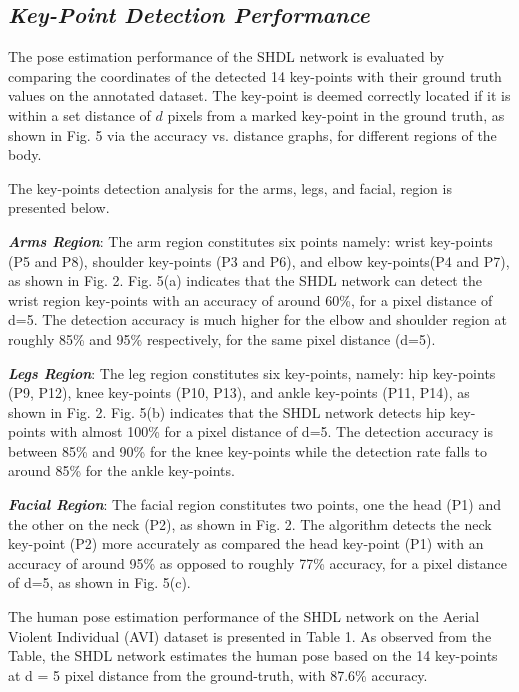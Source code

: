 \documentclass[10pt,twocolumn,letterpaper]{article}
\begin{document}
\subsection{\textbf{\textit{Key-Point Detection Performance}}}
The pose estimation performance of the SHDL network is evaluated by comparing the coordinates of the detected 14 key-points with their ground truth values on the annotated dataset. The key-point is deemed correctly located if it is within a set distance of $d$ pixels from a marked key-point in the ground truth, as shown in Fig. 5 via the accuracy vs. distance graphs, for different regions of the body.

The key-points detection analysis for the arms, legs, and facial, region is presented below. 

\textbf{\textit{Arms Region}}: The arm region constitutes six points namely: wrist key-points (P5 and P8), shoulder key-points (P3 and P6), and elbow key-points(P4 and P7), as shown in Fig. 2. Fig. 5(a) indicates that the SHDL network can detect the wrist region key-points with an accuracy of around 60\%, for a pixel distance of d=5. The detection accuracy is much higher for the elbow and shoulder region at roughly 85\% and 95\% respectively, for the same pixel distance (d=5).

\textbf{\textit{Legs Region}}: The leg region constitutes six key-points, namely: hip key-points (P9, P12), knee key-points (P10, P13), and ankle key-points (P11, P14), as shown in Fig. 2. Fig. 5(b) indicates that the SHDL network detects hip key-points with almost 100\% for a pixel distance of d=5. The detection accuracy is between 85\% and 90\% for the knee key-points while the detection rate falls to around 85\% for the ankle key-points.

\textbf{\textit{Facial Region}}: The facial region constitutes two points, one the head (P1) and the other on the neck (P2), as shown in Fig. 2. The algorithm detects the neck key-point (P2) more accurately as compared the head key-point (P1) with an accuracy of around 95\% as opposed to roughly 77\% accuracy, for a pixel distance of d=5, as shown in Fig. 5(c).

The human pose estimation performance of the SHDL network on the Aerial Violent Individual (AVI) dataset is presented in Table 1. As observed from the Table, the SHDL network estimates the human pose based on the 14 key-points at d = 5 pixel distance from the ground-truth, with 87.6\% accuracy. 
\end{document}
